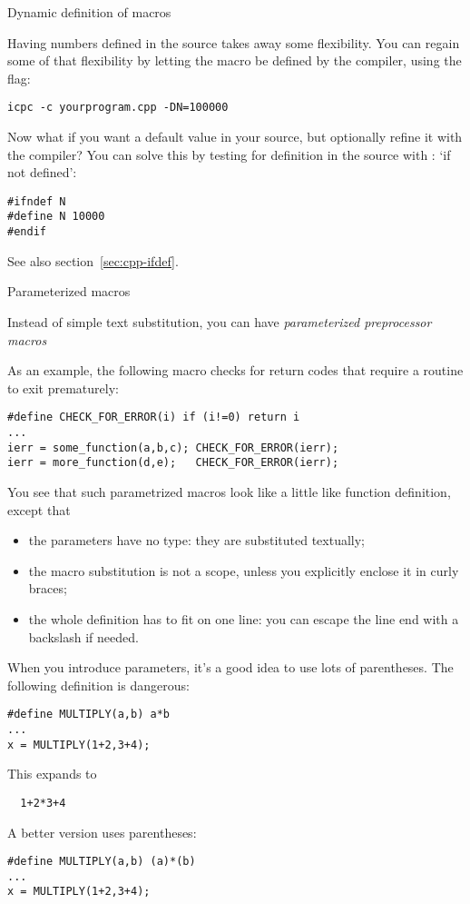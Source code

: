  {Dynamic definition of macros}

Having numbers defined in the source takes away some flexibility.
You can regain some of that flexibility by letting the macro
be defined by the compiler, using the  flag:
\begin{verbatim}
icpc -c yourprogram.cpp -DN=100000
\end{verbatim}

Now what if you want a default value in your source,
but optionally refine it with the compiler?
You can solve this by testing for definition
in the source with : `if not defined':
\begin{lstlisting}
#ifndef N
#define N 10000
#endif
\end{lstlisting}
See also section~\ref{sec:cpp-ifdef}.

 {Parameterized macros}
\label{sec:cpp-define-fun}

Instead of simple text substitution, you can have
%
\emph{parameterized preprocessor macros}

As an example, the following macro checks for return codes
that require a routine to exit prematurely:
\begin{lstlisting}
#define CHECK_FOR_ERROR(i) if (i!=0) return i
...
ierr = some_function(a,b,c); CHECK_FOR_ERROR(ierr);
ierr = more_function(d,e);   CHECK_FOR_ERROR(ierr);
\end{lstlisting}

You see that such parametrized macros look like a little like function definition,
except that
\begin{itemize}
\item the parameters have no type: they are substituted textually;
\item the macro substitution is not a scope, unless you explicitly enclose it in curly braces;
\item the whole definition has to fit on one line:
  you can escape
  the line end with a backslash if needed.
\end{itemize}

When you introduce parameters, it's a good idea to use lots of parentheses.
The following definition is dangerous:
\begin{lstlisting}
#define MULTIPLY(a,b) a*b
...
x = MULTIPLY(1+2,3+4);
\end{lstlisting}
This expands to 
\begin{lstlisting}
  1+2*3+4
\end{lstlisting}
A better version uses parentheses:
\begin{lstlisting}
#define MULTIPLY(a,b) (a)*(b)
...
x = MULTIPLY(1+2,3+4);
\end{lstlisting}

